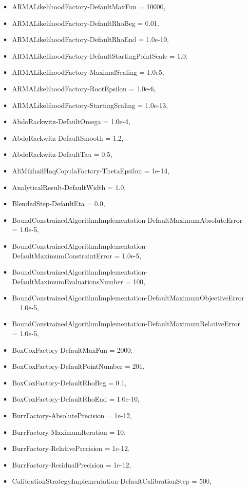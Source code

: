 \begin{itemize}
\item
  ARMALikelihoodFactory-DefaultMaxFun = 10000,
\item
  ARMALikelihoodFactory-DefaultRhoBeg = 0.01,
\item
  ARMALikelihoodFactory-DefaultRhoEnd = 1.0e-10,
\item
  ARMALikelihoodFactory-DefaultStartingPointScale = 1.0,
\item
  ARMALikelihoodFactory-MaximalScaling = 1.0e5,
\item
  ARMALikelihoodFactory-RootEpsilon = 1.0e-6,
\item
  ARMALikelihoodFactory-StartingScaling = 1.0e-13,
\item
  AbdoRackwitz-DefaultOmega = 1.0e-4,
\item
  AbdoRackwitz-DefaultSmooth = 1.2,
\item
  AbdoRackwitz-DefaultTau = 0.5,
\item
  AliMikhailHaqCopulaFactory-ThetaEpsilon = 1e-14,
\item
  AnalyticalResult-DefaultWidth = 1.0,
\item
  BlendedStep-DefaultEta = 0.0,
\item
  BoundConstrainedAlgorithmImplementation-DefaultMaximumAbsoluteError = 1.0e-5,
\item
  BoundConstrainedAlgorithmImplementation-DefaultMaximumConstraintError = 1.0e-5,
\item
  BoundConstrainedAlgorithmImplementation-DefaultMaximumEvaluationsNumber = 100,
\item
  BoundConstrainedAlgorithmImplementation-DefaultMaximumObjectiveError = 1.0e-5,
\item
  BoundConstrainedAlgorithmImplementation-DefaultMaximumRelativeError = 1.0e-5,
\item
  BoxCoxFactory-DefaultMaxFun = 2000,
\item
  BoxCoxFactory-DefaultPointNumber = 201,
\item
  BoxCoxFactory-DefaultRhoBeg = 0.1,
\item
  BoxCoxFactory-DefaultRhoEnd = 1.0e-10,
\item
  BurrFactory-AbsolutePrecision = 1e-12,
\item
  BurrFactory-MaximumIteration = 10,
\item
  BurrFactory-RelativePrecision = 1e-12,
\item
  BurrFactory-ResidualPrecision = 1e-12,
\item
  CalibrationStrategyImplementation-DefaultCalibrationStep = 500,

\end{itemize}
